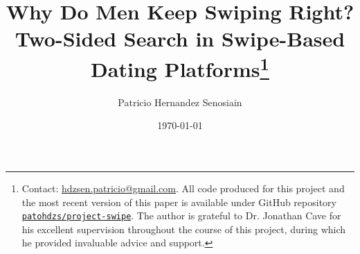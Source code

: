 \title{Why Do Men Keep Swiping Right? Two-Sided Search in Swipe-Based Dating Platforms\thanks{Contact: \href{mailto:hdzsen.patricio@gmail.com}{hdzsen.patricio@gmail.com}. All code produced for this project and the most recent version of this paper is available under GitHub repository \href{https://github.com/patohdzs/project-swipe}{\texttt{patohdzs/project-swipe}}. The author is grateful to Dr. Jonathan Cave for his excellent supervision throughout the course of this project, during which he provided invaluable advice and support.}} 
\author{Patricio Hernandez Senosiain}  
\date{\today}

\maketitle
 
\setcounter{page}{0}
\thispagestyle{empty} 

\clearpage
\renewcommand{\thefootnote}{\arabic{footnote}}
\pagestyle{fancy}
\fancyhf{}
\setlength{\headheight}{14.49998pt}
\addtolength{\topmargin}{-2.49998pt} 
\def\layersep{2.5cm}
\lfoot{\centering \thepage}
\onehalfspacing 